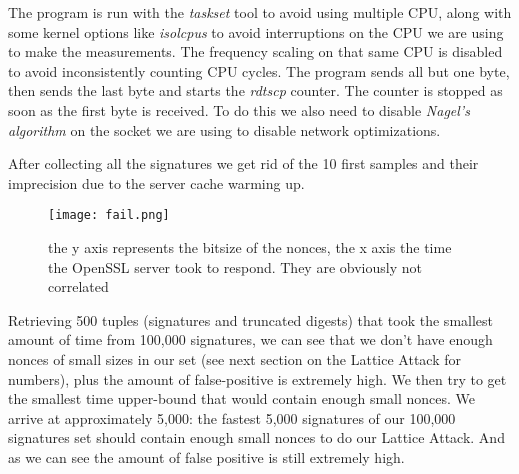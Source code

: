 \documentclass[a4paper,11pt]{article}
\begin{document}
The program is run with the \textit{taskset} tool to avoid using multiple CPU, along with some kernel options like \textit{isolcpus} to avoid interruptions on the CPU we are using to make the measurements. The frequency scaling on that same CPU is disabled to avoid inconsistently counting CPU cycles. The program sends all but one byte, then sends the last byte and starts the \textit{rdtscp} counter. The counter is stopped as soon as the first byte is received. To do this we also need to disable \textit{Nagel's algorithm} on the socket we are using to disable network optimizations.

After collecting all the signatures we get rid of the 10 first samples and their imprecision due to the server cache warming up.

\begin{figure}[H]
\texttt{[image: fail.png]}
\caption{the y axis represents the bitsize of the nonces, the x axis the time the OpenSSL server took to respond. They are obviously not correlated}
\end{figure}

Retrieving 500 tuples (signatures and truncated digests) that took the smallest amount of time from 100,000 signatures, we can see that we don't have enough nonces of small sizes in our set (see next section on the Lattice Attack for numbers), plus the amount of false-positive is extremely high. We then try to get the smallest time upper-bound that would contain enough small nonces. We arrive at approximately 5,000: the fastest 5,000 signatures of our 100,000 signatures set should contain enough small nonces to do our Lattice Attack. And as we can see the amount of false positive is still extremely high.
\end{document}
